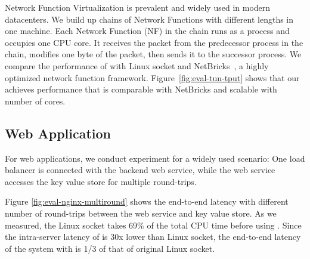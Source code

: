 Network Function Virtualization is prevalent and widely used in modern datacenters. We build up chains of Network Functions with different lengths in one machine. Each Network Function (NF) in the chain runs as a process and occupies one CPU core. It receives the packet from the predecessor process in the chain, modifies one byte of the packet, then sends it to the successor process. We compare the performance of \sys{} with Linux socket and NetBricks~\cite{panda2016netbricks}, a highly optimized network function framework. Figure~\ref{fig:eval-tun-tput} shows that our \sys achieves performance that is comparable with NetBricks and scalable with number of cores.



\subsection{Web Application}
For web applications, we conduct experiment for a widely used scenario: One load balancer is connected with the backend web service, while the web service accesses the key value store for multiple round-trips.

Figure \ref{fig:eval-nginx-multiround} shows the end-to-end latency with different number of round-trips between the web service and key value store. As we measured, the Linux socket takes 69\% of the total CPU time before using \libipc. Since the intra-server latency of \sys{} is 30x lower than Linux socket, the end-to-end latency of the system with \sys{}  is 1/3 of that of original Linux socket.













